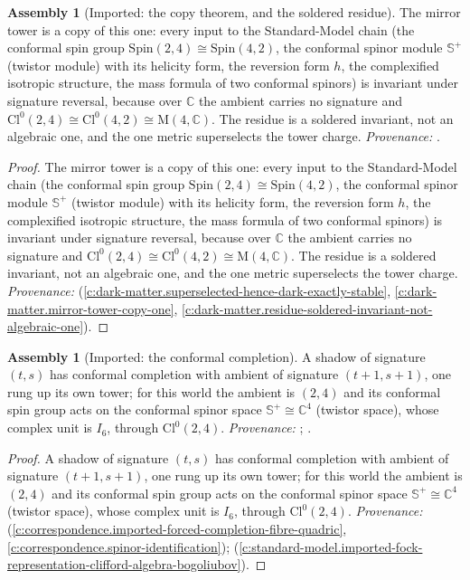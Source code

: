 \documentclass[11pt]{article}
\theoremstyle{definition}
\newtheorem{assembled}[theorem]{Assembly}
\theoremstyle{plain}
\newcommand{\changedmark}[2]{\marginpar{\raggedright\scriptsize\color{#1}#2}}
\providecommand{\C}{}\renewcommand{\C}{\mathbb{C}}
\providecommand{\CS}{}\renewcommand{\CS}{{\mathbb{S}^{+}}}
\providecommand{\Cl}{}\renewcommand{\Cl}{\mathrm{Cl}}
\providecommand{\Mat}{}\renewcommand{\Mat}{\mathrm{M}}
\begin{document}
\begin{assembled}[Imported: the copy theorem, and the soldered residue]\label{c:odd-extensions.imported-copy-theorem-soldered-residue}
\changedmark{gray}{reworded}
The mirror tower is a copy of this one: every input to the Standard-Model chain (the conformal spin group $\mathrm{Spin}(2,4) \cong \mathrm{Spin}(4,2)$, the conformal spinor module $\CS$ (twistor module) with its helicity form, the reversion form $h$, the complexified isotropic structure, the mass formula of two conformal spinors) is invariant under signature reversal, because over $\C$ the ambient carries no signature and $\Cl^{0}(2,4) \cong \Cl^{0}(4,2) \cong \Mat(4,\C)$. The residue is a soldered invariant, not an algebraic one, and the one metric superselects the tower charge. \emph{Provenance:} \cite[Thms.~3.5 and 4.3, Prop.~4.1]{ButlerT14}.
\end{assembled}
\begin{proof}
The mirror tower is a copy of this one: every input to the Standard-Model chain (the conformal spin group $\mathrm{Spin}(2,4) \cong \mathrm{Spin}(4,2)$, the conformal spinor module $\CS$ (twistor module) with its helicity form, the reversion form $h$, the complexified isotropic structure, the mass formula of two conformal spinors) is invariant under signature reversal, because over $\C$ the ambient carries no signature and $\Cl^{0}(2,4) \cong \Cl^{0}(4,2) \cong \Mat(4,\C)$. The residue is a soldered invariant, not an algebraic one, and the one metric superselects the tower charge. \emph{Provenance:} \cite[Thms.~3.5 and 4.3, Prop.~4.1]{ButlerT14} (\ref{c:dark-matter.superselected-hence-dark-exactly-stable}, \ref{c:dark-matter.mirror-tower-copy-one}, \ref{c:dark-matter.residue-soldered-invariant-not-algebraic-one}).

\end{proof}

\begin{assembled}[Imported: the conformal completion]\label{c:odd-extensions.imported-conformal-completion}
\changedmark{gray}{reworded}
A shadow of signature $(t,s)$ has conformal completion with ambient of signature $(t+1, s+1)$, one rung up its own tower; for this world the ambient is $(2,4)$ and its conformal spin group acts on the conformal spinor space $\CS \cong \C^{4}$ (twistor space), whose complex unit is $I_6$, through $\Cl^{0}(2,4)$. \emph{Provenance:} \cite[Fact~2.1, Thm.~3.4]{ButlerT9}; \cite[Fact~2.11]{ButlerT12}.
\end{assembled}
\begin{proof}
A shadow of signature $(t,s)$ has conformal completion with ambient of signature $(t+1, s+1)$, one rung up its own tower; for this world the ambient is $(2,4)$ and its conformal spin group acts on the conformal spinor space $\CS \cong \C^{4}$ (twistor space), whose complex unit is $I_6$, through $\Cl^{0}(2,4)$. \emph{Provenance:} \cite[Fact~2.1, Thm.~3.4]{ButlerT9} (\ref{c:correspondence.imported-forced-completion-fibre-quadric}, \ref{c:correspondence.spinor-identification}); \cite[Fact~2.11]{ButlerT12} (\ref{c:standard-model.imported-fock-representation-clifford-algebra-bogoliubov}).

\end{proof}
\end{document}
